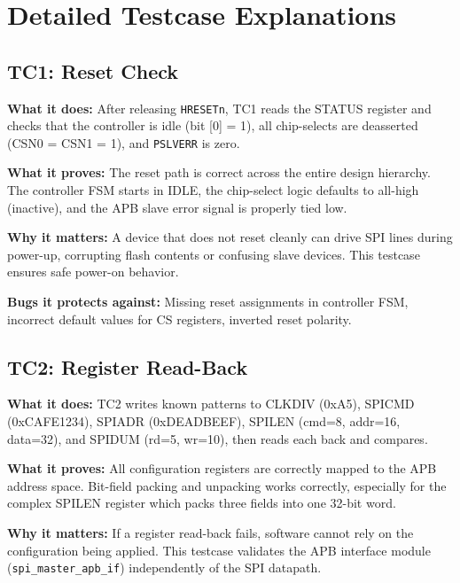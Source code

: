 \chapter{Detailed Testcase Explanations}
\label{ch:tc_detail}

\section{TC1: Reset Check}

\textbf{What it does:} After releasing \texttt{HRESETn}, TC1 reads the STATUS register and checks
that the controller is idle (bit [0] = 1), all chip-selects are deasserted (CSN0 = CSN1 = 1), and
\texttt{PSLVERR} is zero.

\textbf{What it proves:} The reset path is correct across the entire design hierarchy. The
controller FSM starts in IDLE, the chip-select logic defaults to all-high (inactive), and the
APB slave error signal is properly tied low.

\textbf{Why it matters:} A device that does not reset cleanly can drive SPI lines during
power-up, corrupting flash contents or confusing slave devices. This testcase ensures safe
power-on behavior.

\textbf{Bugs it protects against:} Missing reset assignments in controller FSM, incorrect
default values for CS registers, inverted reset polarity.

\section{TC2: Register Read-Back}

\textbf{What it does:} TC2 writes known patterns to CLKDIV (0xA5), SPICMD (0xCAFE1234), SPIADR
(0xDEADBEEF), SPILEN (cmd=8, addr=16, data=32), and SPIDUM (rd=5, wr=10), then reads each back
and compares.

\textbf{What it proves:} All configuration registers are correctly mapped to the APB address space.
Bit-field packing and unpacking works correctly, especially for the complex SPILEN register which
packs three fields into one 32-bit word.

\textbf{Why it matters:} If a register read-back fails, software cannot rely on the configuration
being applied. This testcase validates the APB interface module (\texttt{spi\_master\_apb\_if})
independently of the SPI datapath.

